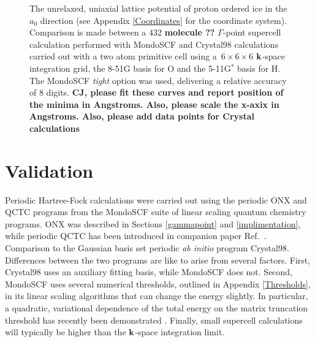 \documentclass[prb,aps,nobibnotes,twocolumn,doublespace,twocolumngrid,superbib]{revtex4}
\begin{document}
\begin{figure}
\caption{The unrelaxed, uniaxial lattice potential of proton ordered ice \cite{}
in the $a_0$ direction (see Appendix \ref{Coordinates} for the coordinate system).  
Comparison is made between a 432 {\bf molecule ??} $\Gamma$-point supercell calculation performed 
with {\sc MondoSCF} and {\sc Crystal98} calculations carried out with a two atom primitive
cell using a~$6\times6\times6$ $\bf k$-space integration grid, the 8-51G basis for O and the 
5-11G$^*$ basis for H.  The {\sc MondoSCF} {\it tight} option was used, delivering 
a relative accuracy of 8 digits. {\bf CJ, please fit these curves and report position
of the minima in Angstroms.  Also, please scale the x-axix in Angstroms.  Also,
please add data points for Crystal calculations}}
\label{IceEnergyVsLattice}
\end{figure}

\pagebreak 

\section{Validation}

Periodic Hartree-Fock calculations were carried out using the periodic {\sc ONX} and {\sc QCTC}
programs from the {\sc MondoSCF} suite of linear scaling quantum chemistry programs.  {\sc ONX} was 
described in Sections \ref{gammapoint} and \ref{implimentation}, while periodic {\sc QCTC} has 
been introduced in companion paper Ref.~\cite{CTymczak04a}.   Comparison to the 
Gaussian basis set periodic {\em ab initio} program {\sc Crystal98}.  Differences between the
two programs are like to arise from several factors.  First, {\sc Crystal98} uses an auxiliary
fitting basis, while {\sc MondoSCF} does not.  Second, {\sc MondoSCF} uses several numerical 
thresholds, outlined in Appendix \ref{Thresholds}, in its linear scaling algorithms that can change 
the energy slightly.   In particular, a quadratic, variational dependence of the total energy
on the  matrix truncation threshold has recently been demonstrated \cite{ANiklasson03}.  Finally, 
small supercell calculations will typically be higher than the $\bf k$-space integration limit.
\end{document}
